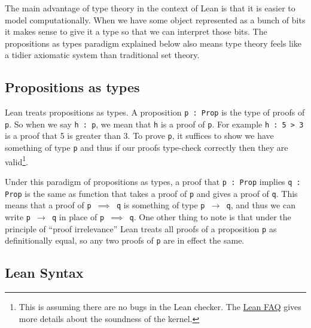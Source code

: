 \documentclass{article}
\renewcommand{\a}{\alpha}
\newcommand{\ct}{\texttt}
\begin{document}

The main advantage of type theory in the context of Lean is that it is easier to model computationally.
When we have some object represented as a bunch of bits it makes sense to give it a type so that we can interpret those bits.
The propositions as types paradigm explained below also means type theory feels like a tidier axiomatic system than traditional set theory.

\subsection{Propositions as types}
Lean treats propositions as types. 
A proposition \ct{p : Prop} is the type of proofs of \ct{p}.
So when we say \ct{h : p}, we mean that \ct{h} is a proof of \ct{p}.
For example \ct{h : 5 > 3} is a proof that 5 is greater than 3.
To prove \ct{p}, it suffices to show we have something of type \ct{p} and thus if our proofs type-check correctly then they are valid\footnote{This is assuming there are no bugs in the Lean checker. The \href{https://github.com/leodemoura/lean/blob/master/doc/faq.md}{Lean FAQ} gives more details about the soundness of the kernel.}.

Under this paradigm of propositions as types, a proof that \ct{p : Prop} implies \ct{q : Prop} is the same as function that takes a proof of \ct{p} and gives a proof of \ct{q}.
This means that a proof of \ct{p $\implies$ q} is something of type \ct{p $\to$ q}, and thus we can write \ct{p $\to$ q} in place of \ct{p $\implies$ q}.
One other thing to note is that under the principle of ``proof irrelevance'' Lean treats all proofs of a proposition \ct{p} as definitionally equal, so any two proofs of \ct{p} are in effect the same.

\subsection{Lean Syntax} 
\end{document}
